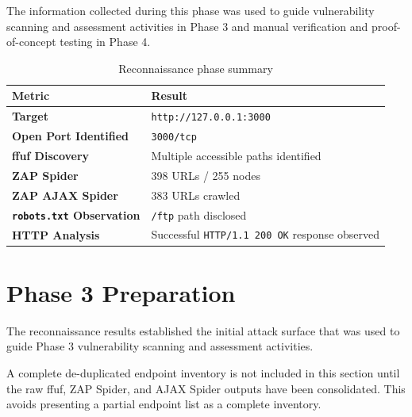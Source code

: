 The information collected during this phase was used to guide vulnerability
scanning and assessment activities in Phase 3 and manual verification and
proof-of-concept testing in Phase 4.

\begin{table}[H]
\centering
\begin{tabularx}{\textwidth}{>{\bfseries}p{} X}
\toprule
Metric & Result \\
\midrule
Target &
\texttt{http://127.0.0.1:3000} \\

Open Port Identified &
\texttt{3000/tcp} \\

ffuf Discovery &
Multiple accessible paths identified \\

ZAP Spider &
398 URLs / 255 nodes \\

ZAP AJAX Spider &
383 URLs crawled \\

\texttt{robots.txt} Observation &
\texttt{/ftp} path disclosed \\

HTTP Analysis &
Successful \texttt{HTTP/1.1 200 OK} response observed \\
\bottomrule
\end{tabularx}
\caption{Reconnaissance phase summary}
\label{tab:recon-summary}
\end{table}

\section{Phase 3 Preparation}

The reconnaissance results established the initial attack surface that was
used to guide Phase 3 vulnerability scanning and assessment activities.

A complete de-duplicated endpoint inventory is not included in this section
until the raw ffuf, ZAP Spider, and AJAX Spider outputs have been consolidated.
This avoids presenting a partial endpoint list as a complete inventory.